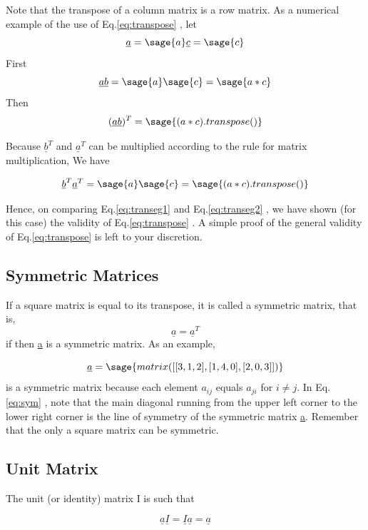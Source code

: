 \documentclass[12pt]{report}
\newcommand{\lab}[1]{
Eq.\ref{#1}
}
\begin{document}
Note that the transpose of a column matrix is a row matrix. As a
numerical example of the use of \lab{eq:transpose}, let
$$\underline{a} = \sage{a}  \underline{c} = \sage{c}$$
First$$\underline{a}\underline{b} = \sage{a}\sage{c}=\sage{a*c}$$
Then \begin{equation}(\underline{a}\underline{b})^T= \sage{(a*c).transpose()}\label{eq:transeg1}\end{equation}

Because $\underline{b}^T$ and $\underline{a}^T$ can be multiplied
according to the rule for matrix multiplication, We have

\begin{equation} \underline{b}^T\underline{a}^T = \sage{a} \sage{c} = \sage{(a*c).transpose()}\label{eq:transeg2}\end{equation}

Hence, on comparing \lab{eq:transeg1} and \lab{eq:transeg2}, we have shown (for this
case) the validity of \lab{eq:transpose}. A simple proof of the general
validity of \lab{eq:transpose} is left to your discretion.
\subsection{Symmetric Matrices}
If a square matrix is equal to its transpose, it is called a symmetric
matrix, that is,
\begin{equation} \underline{a} = \underline{a}^T \end{equation}
 if then \underline{a} is a symmetric matrix. As an
example,

\begin{equation}\underline{a}=\sage{matrix([[3,1,2],[1,4,0],[2,0,3]])}\label{eq:sym}\end{equation}
is a symmetric matrix because each element $a_{{ij}}$ equals $a_{{ji}}$ for $i
\neq j$. In \lab{eq:sym}, note that the main diagonal running from the
upper left corner to the lower right corner is the line of symmetry of
the symmetric matrix \underline{a}. Remember that the only a square
matrix can be symmetric.
\subsection{Unit Matrix}
The unit (or identity) matrix I is such that

\begin{equation}\underline{a}\underline{I}=\underline{I}\underline{a}=\underline{a}\end{equation}
\end{document}
